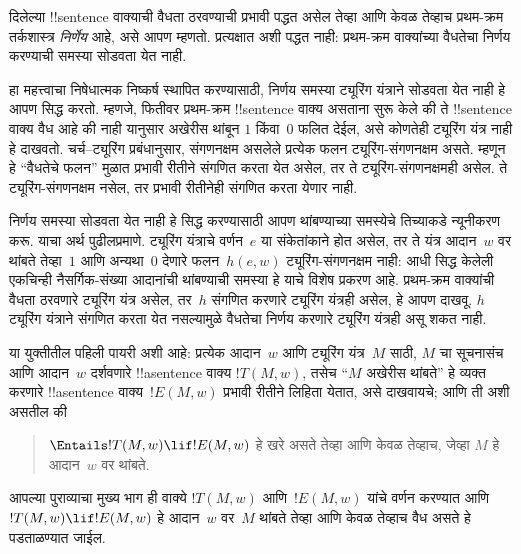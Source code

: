 \documentclass[../../../include/open-logic-section]{subfiles}
\begin{document}

दिलेल्या !!{sentence} वाक्याची वैधता ठरवण्याची
प्रभावी पद्धत असेल तेव्हा आणि केवळ तेव्हाच
प्रथम-क्रम तर्कशास्त्र \emph{निर्णेय} आहे,
असे आपण म्हणतो. प्रत्यक्षात अशी पद्धत नाही:
प्रथम-क्रम वाक्यांच्या वैधतेचा निर्णय
करण्याची समस्या सोडवता येत नाही.

हा महत्त्वाचा निषेधात्मक निष्कर्ष स्थापित
करण्यासाठी, निर्णय समस्या ट्यूरिंग यंत्राने
सोडवता येत नाही हे आपण सिद्ध करतो.
म्हणजे, फितीवर प्रथम-क्रम !!{sentence}
वाक्य असताना सुरू केले की ते !!{sentence} वाक्य वैध
आहे की नाही यानुसार अखेरीस थांबून
$1$ किंवा~$0$ फलित देईल, असे कोणतेही
ट्यूरिंग यंत्र नाही हे दाखवतो.
चर्च--ट्यूरिंग प्रबंधानुसार, संगणनक्षम
असलेले प्रत्येक फलन ट्यूरिंग-संगणनक्षम
असते. म्हणून हे “वैधतेचे फलन”
मुळात प्रभावी रीतीने संगणित करता
येत असेल, तर ते ट्यूरिंग-संगणनक्षमही
असेल. ते ट्यूरिंग-संगणनक्षम नसेल,
तर प्रभावी रीतीनेही संगणित करता
येणार नाही.

निर्णय समस्या सोडवता येत नाही हे
सिद्ध करण्यासाठी आपण थांबण्याच्या
समस्येचे तिच्याकडे न्यूनीकरण करू.
याचा अर्थ पुढीलप्रमाणे. ट्यूरिंग
यंत्राचे वर्णन~$e$ या संकेतांकाने होत असेल,
तर ते यंत्र आदान~$w$ वर थांबते
तेव्हा~$1$ आणि अन्यथा~$0$ देणारे
फलन~$h(e,w)$ ट्यूरिंग-संगणनक्षम
नाही: आधी सिद्ध केलेली एकचिन्ही नैसर्गिक-संख्या आदानांची
थांबण्याची समस्या हे याचे विशेष प्रकरण आहे.
प्रथम-क्रम वाक्यांची वैधता ठरवणारे
ट्यूरिंग यंत्र असेल, तर~$h$ संगणित
करणारे ट्यूरिंग यंत्रही असेल, हे
आपण दाखवू. $h$ ट्यूरिंग यंत्राने
संगणित करता येत नसल्यामुळे वैधतेचा
निर्णय करणारे ट्यूरिंग यंत्रही असू
शकत नाही.

या युक्तीतील पहिली पायरी अशी आहे:
प्रत्येक आदान~$w$ आणि ट्यूरिंग
यंत्र~$M$ साठी, $M$ चा सूचनासंच
आणि आदान~$w$ दर्शवणारे
!!a{sentence} वाक्य $!T(M, w)$,
तसेच “$M$ अखेरीस थांबते”
हे व्यक्त करणारे !!a{sentence}
वाक्य~$!E(M, w)$ प्रभावी रीतीने
लिहिता येतात, असे दाखवायचे;
आणि ती अशी असतील की
\begin{quote}
  $\Entails !T(M, w) \lif !E(M,w)$ हे खरे असते तेव्हा आणि केवळ तेव्हाच, जेव्हा $M$ हे आदान~$w$ वर थांबते.
\end{quote}
आपल्या पुराव्याचा मुख्य भाग ही
वाक्ये $!T(M, w)$ आणि~$!E(M, w)$
यांचे वर्णन करण्यात आणि
$!T(M, w) \lif !E(M, w)$ हे
आदान~$w$ वर~$M$ थांबते तेव्हा आणि केवळ तेव्हाच
वैध असते हे पडताळण्यात जाईल.
\end{document}
